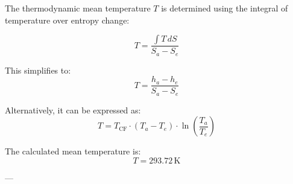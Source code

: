 The thermodynamic mean temperature \( T \) is determined using the integral of temperature over entropy change:  

\[
T = \frac{\int T \, dS}{S_a - S_e}
\]

This simplifies to:  
\[
T = \frac{h_a - h_e}{S_a - S_e}
\]

Alternatively, it can be expressed as:  
\[
T = T_{\text{CF}} \cdot (T_a - T_e) \cdot \ln \left( \frac{T_a}{T_e} \right)
\]

The calculated mean temperature is:  
\[
T = 293.72 \, \text{K}
\]

---